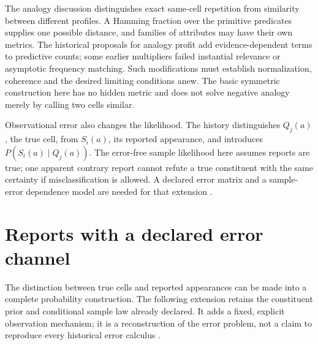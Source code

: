 The analogy discussion distinguishes exact same-cell repetition from
similarity between different profiles. A Hamming fraction over the
primitive predicates supplies one possible distance, and families of
attributes may have their own metrics. The historical proposals for
analogy profit add evidence-dependent terms to predictive counts;
some earlier multipliers failed instantial relevance or asymptotic
frequency matching. Such modifications must establish normalization,
coherence and the desired limiting conditions anew. The basic symmetric
construction here has no hidden metric and does not solve negative
analogy merely by calling two cells similar.

Observational error also changes the likelihood. The history
distinguishes \(Q_j(a)\), the true cell, from \(S_i(a)\), its
reported appearance, and introduces \(P(S_i(a)\mid Q_j(a))\).
The error-free sample likelihood here assumes reports are true; one
apparent contrary report cannot refute a true constituent with the
same certainty if misclassification is allowed. A declared error matrix
and a sample-error dependence model are needed for that extension
\cite[sec.~9, pp.~340--343]{Niiniluoto2011HintikkaProgramReading}.

\section{Reports with a declared error channel}
\label{sec:p15-hintikka-error-channel}

The distinction between true cells and reported appearances can be made
into a complete probability construction. The following extension retains
the constituent prior and conditional sample law already declared. It adds
a fixed, explicit observation mechanism; it is a reconstruction of the
error problem, not a claim to reproduce every historical error calculus
\cite[sec.~9, pp.~340--343]{Niiniluoto2011HintikkaProgramReading}.

